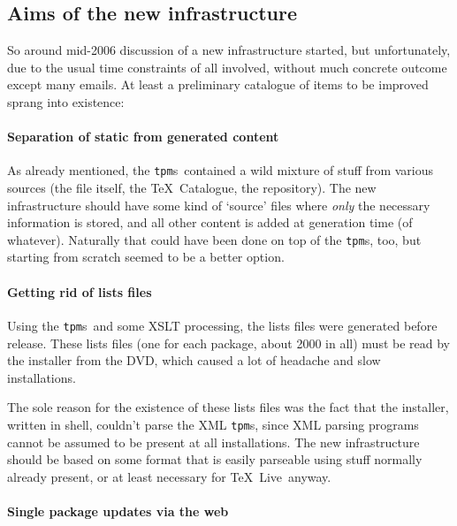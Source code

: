 \documentclass{arstexnica}
\newcommand{\tl}{\TeX~Live}
\newcommand{\tpm}{\texttt{tpm}}
\newcommand{\tpms}{\tpm{}s}
\begin{document}
\begin{article}
\section{Aims of the new infrastructure}
\label{sec:aims}

So around mid-2006 discussion of a new infrastructure started, but
unfortunately, due to the usual time constraints of all involved,
without much concrete outcome except many emails. At least a preliminary
catalogue of items to be improved sprang into existence:


\paragraph{Separation of static from generated content}

As already mentioned, the \tpms\ contained a wild mixture of stuff from
various sources (the file itself, the \TeX\ Catalogue, the
repository). The new infrastructure should have some kind of `source'
files where {\em only} the necessary information is stored, and all other
content is added at generation time (of whatever). Naturally that
could have been done on top of the \tpms, too, but starting from
scratch seemed to be a better option.

\paragraph{Getting rid of lists files}

Using the \tpms\ and some XSLT processing, the lists files were generated
before release. These lists files (one for each package, about 2000 in all)
must be read by the installer from the DVD, which caused a lot of
headache and slow installations. 

The sole reason for the existence of these lists files was the fact
that the installer, written in shell, couldn't parse the XML \tpms,
since XML parsing programs cannot be assumed to be present at all
installations. The new infrastructure should be based on some format
that is easily parseable using stuff normally already present, or at
least necessary for \tl\ anyway. 

\paragraph{Single package updates via the web}


\end{article}
\end{document}
